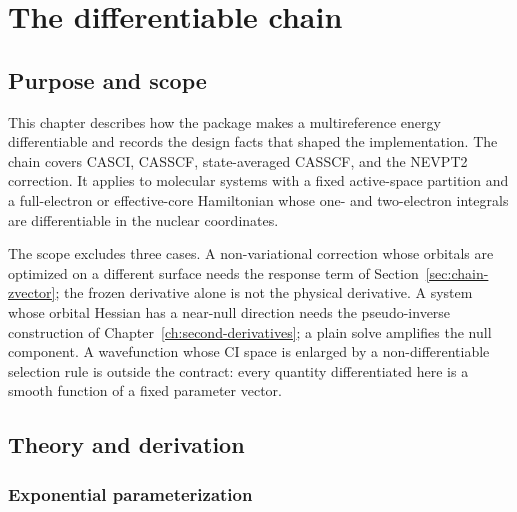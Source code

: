 \chapter{The differentiable chain}
\label{ch:differentiable-chain}

\section{Purpose and scope}

This chapter describes how the package makes a multireference energy
differentiable and records the design facts that shaped the
implementation.  The chain covers CASCI, CASSCF, state-averaged CASSCF,
and the NEVPT2 correction.  It applies to molecular systems with a
fixed active-space partition and a full-electron or effective-core
Hamiltonian whose one- and two-electron integrals are differentiable in
the nuclear coordinates.

The scope excludes three cases.  A non-variational correction whose
orbitals are optimized on a different surface needs the response term
of Section~\ref{sec:chain-zvector}; the frozen derivative alone is not
the physical derivative.  A system whose orbital Hessian has a
near-null direction needs the pseudo-inverse construction of
Chapter~\ref{ch:second-derivatives}; a plain solve amplifies the null
component.  A wavefunction whose CI space is enlarged by a
non-differentiable selection rule is outside the contract: every
quantity differentiated here is a smooth function of a fixed parameter
vector.

\section{Theory and derivation}
\label{sec:chain-theory}

\subsection{Exponential parameterization}

